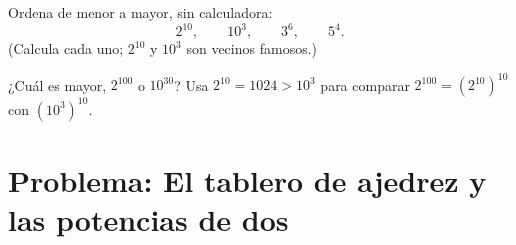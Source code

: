 \begin{exercise}[$\star\star$]\label{exo:g8:powers:10}
Ordena de menor a mayor, sin calculadora:
\[
2^{10}, \qquad 10^3, \qquad 3^6, \qquad 5^4 .
\]
(Calcula cada uno; $2^{10}$ y $10^3$ son vecinos famosos.)
\end{exercise}

\begin{exercise}[$\star\star\star$]\label{exo:g8:powers:11}
¿Cuál es mayor, $2^{100}$ o $10^{30}$? Usa
$2^{10} = 1024 > 10^3$ para comparar
$2^{100} = \left(2^{10}\right)^{10}$ con
$\left(10^3\right)^{10}$.
\end{exercise}

\section{Problema: El tablero de ajedrez y las potencias de dos}

